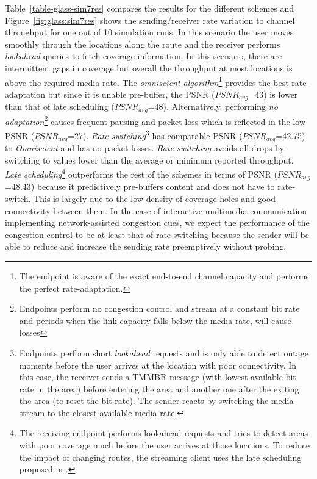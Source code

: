 Table~\ref{table-glass-sim7res} compares the results for the different schemes
and Figure~\ref{fig:glass:sim7res} shows the sending/receiver rate variation
to channel throughput for one out of 10 simulation runs. In this scenario the
user moves smoothly through the locations along the route and the receiver
performs \emph{lookahead} queries to fetch coverage information. In this
scenario, there are intermittent gaps in coverage but overall the throughput
at most locations is above the required media rate. The \emph{omniscient
algorithm}\footnote{The endpoint is aware of the exact end-to-end channel
capacity and performs the perfect rate-adaptation.} provides the best
rate-adaptation but since it is unable pre-buffer, the PSNR ($PSNR_{avg}$=43)
is lower than that of late scheduling ($PSNR_{avg}$=48). Alternatively,
performing \emph{no adaptation}\footnote{Endpoints perform no congestion
control and stream at a constant bit rate and periods when the link capacity
falls below the media rate, will cause losses} causes frequent pausing and
packet loss which is reflected in the low PSNR ($PSNR_{avg}$=27).
\emph{Rate-switching}\footnote{Endpoints perform short \emph{lookahead}
requests and is only able to detect outage moments before the user arrives at
the location with poor connectivity. In this case, the receiver sends a TMMBR
message (with lowest available bit rate in the area) before entering the area
and another one after the exiting the area (to reset the bit rate). The sender
reacts by switching the media stream to the closest available media rate.} has
comparable PSNR ($PSNR_{avg}$=42.75) to \emph{Omniscient} and has no packet
losses. \emph{Rate-switching} avoids all drops by switching to values lower
than the average or minimum reported throughput. \emph{Late
scheduling}\footnote{The receiving endpoint performs lookahead requests and
tries to detect areas with poor coverage much before the user arrives at those
locations. To reduce the impact of changing routes, the streaming client uses
the late scheduling proposed in .} outperforms the rest of
the schemes in terms of PSNR ($PSNR_{avg}$=48.43) because it predictively
pre-buffers content and does not have to rate-switch. This is largely due to
the low density of coverage holes and good connectivity between them. In the
case of interactive multimedia communication implementing network-assisted
congestion cues, we expect the performance of the congestion control to be at
least that of rate-switching because the sender will be able to reduce and
increase the sending rate preemptively without probing.

